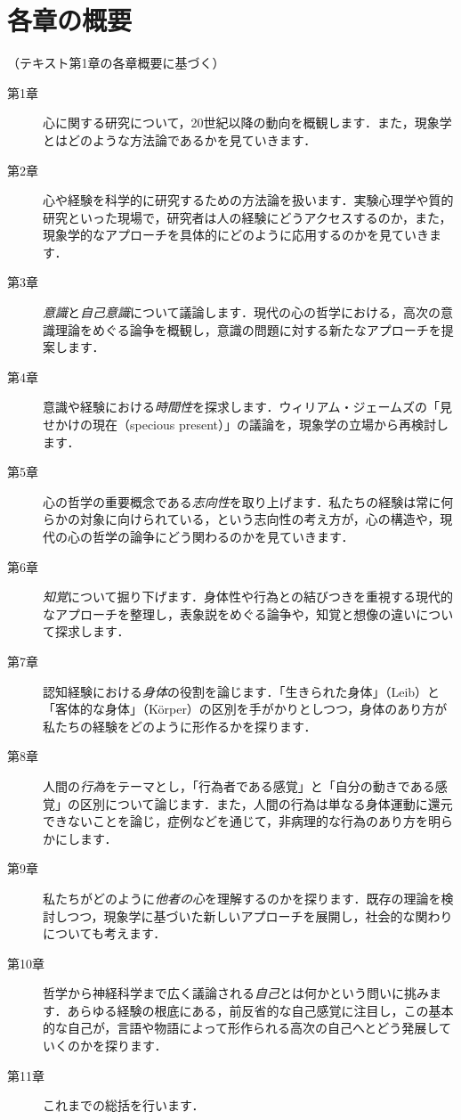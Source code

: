 \documentclass[b5j]{ltjsarticle}
\begin{document}
\section{各章の概要}
\label{sec_chap_sum}

（テキスト第1章の各章概要に基づく）

\begin{description}
  \item[第1章] 心に関する研究について，20世紀以降の動向を概観します．また，現象学とはどのような方法論であるかを見ていきます．
  \item[第2章] 心や経験を科学的に研究するための方法論を扱います．実験心理学や質的研究といった現場で，研究者は人の経験にどうアクセスするのか，また，現象学的なアプローチを具体的にどのように応用するのかを見ていきます．
  \item[第3章] \emph{意識}と\emph{自己意識}について議論します．現代の心の哲学における，高次の意識理論をめぐる論争を概観し，意識の問題に対する新たなアプローチを提案します．
  \item[第4章] 意識や経験における\emph{時間性}を探求します．ウィリアム・ジェームズの「見せかけの現在（specious present）」の議論を，現象学の立場から再検討します．
  \item[第5章] 心の哲学の重要概念である\emph{志向性}を取り上げます．私たちの経験は常に何らかの対象に向けられている，という志向性の考え方が，心の構造や，現代の心の哲学の論争にどう関わるのかを見ていきます．
  \item[第6章] \emph{知覚}について掘り下げます．身体性や行為との結びつきを重視する現代的なアプローチを整理し，表象説をめぐる論争や，知覚と想像の違いについて探求します．
  \item[第7章] 認知経験における\emph{身体}の役割を論じます．「生きられた身体」（Leib）と「客体的な身体」（Körper）の区別を手がかりとしつつ，身体のあり方が私たちの経験をどのように形作るかを探ります．
  \item[第8章] 人間の\emph{行為}をテーマとし，「行為者である感覚」と「自分の動きである感覚」の区別について論じます．また，人間の行為は単なる身体運動に還元できないことを論じ，症例などを通じて，非病理的な行為のあり方を明らかにします．
  \item[第9章] 私たちがどのように\emph{他者の心}を理解するのかを探ります．既存の理論を検討しつつ，現象学に基づいた新しいアプローチを展開し，社会的な関わりについても考えます．
  \item[第10章] 哲学から神経科学まで広く議論される\emph{自己}とは何かという問いに挑みます．あらゆる経験の根底にある，前反省的な自己感覚に注目し，この基本的な自己が，言語や物語によって形作られる高次の自己へとどう発展していくのかを探ります．
  \item[第11章] これまでの総括を行います．
\end{description}
\end{document}
